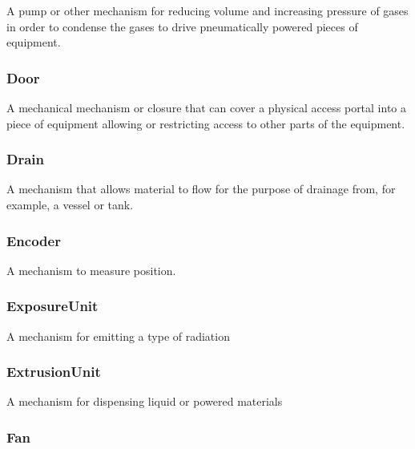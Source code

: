 A pump or other mechanism for reducing volume and increasing pressure of gases in order to condense the gases to drive pneumatically powered pieces of equipment.

\FloatBarrier

\subsubsection{Door}
  \label{sec:Door}


A mechanical mechanism or closure that can cover a physical access portal into a piece of equipment allowing or restricting access to other parts of the equipment.

\FloatBarrier

\subsubsection{Drain}
  \label{sec:Drain}


A mechanism that allows material to flow for the purpose of drainage from, for example, a vessel or tank.

\FloatBarrier

\subsubsection{Encoder}
  \label{sec:Encoder}


A mechanism to measure position.

\FloatBarrier

\subsubsection{ExposureUnit}
  \label{sec:ExposureUnit}


A mechanism for emitting a type of radiation

\FloatBarrier

\subsubsection{ExtrusionUnit}
  \label{sec:ExtrusionUnit}


A mechanism for dispensing liquid or powered materials

\FloatBarrier

\subsubsection{Fan}
  \label{sec:Fan}


